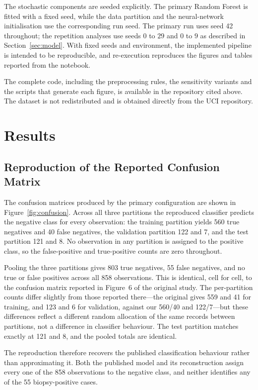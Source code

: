 The stochastic components are seeded explicitly. The primary Random Forest is
fitted with a fixed seed, while the data partition and the neural-network
initialisation use the corresponding run seed. The primary run uses seed 42
throughout; the repetition analyses use seeds $0$ to $29$ and $0$ to $9$ as
described in Section~\ref{sec:model}. With fixed seeds and environment, the
implemented pipeline is intended to be reproducible, and re-execution
reproduces the figures and tables reported from the notebook.

The complete code, including the preprocessing rules, the sensitivity variants
and the scripts that generate each figure, is available in the repository cited
above. The dataset is not redistributed and is obtained directly from the UCI
repository.

\section{Results}\label{sec:results}

\subsection{Reproduction of the Reported Confusion Matrix}\label{sec:cm}

The confusion matrices produced by the primary configuration are shown in
Figure~\ref{fig:confusion}. Across all three partitions the reproduced
classifier predicts the negative class for every observation: the training
partition yields 560 true negatives and 40 false negatives, the validation
partition 122 and 7, and the test partition 121 and 8. No observation in any
partition is assigned to the positive class, so the false-positive and
true-positive counts are zero throughout.

Pooling the three partitions gives 803 true negatives, 55 false negatives, and
no true or false positives across all 858 observations. This is identical, cell
for cell, to the confusion matrix reported in Figure~6 of the original study.
The per-partition counts differ slightly from those reported there---the
original gives 559 and 41 for training, and 123 and 6 for validation, against
our 560/40 and 122/7---but these differences reflect a different random
allocation of the same records between partitions, not a difference in
classifier behaviour. The test partition matches exactly at 121 and 8, and the
pooled totals are identical.

The reproduction therefore recovers the published classification behaviour
rather than approximating it. Both the published model and its reconstruction
assign every one of the 858 observations to the negative class, and neither
identifies any of the 55 biopsy-positive cases.

